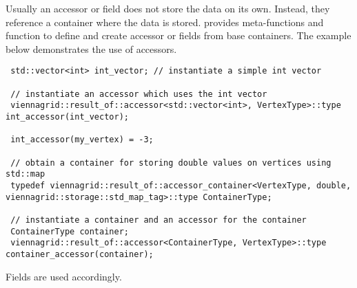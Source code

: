 Usually an accessor or field does not store the data on its own.
Instead, they reference a container where the data is stored.
{\ViennaGrid} provides meta-functions and function to define and create accessor or fields from base containers.
The example below demonstrates the use of {\ViennaGrid} accessors.
 \begin{lstlisting}
 std::vector<int> int_vector; // instantiate a simple int vector

 // instantiate an accessor which uses the int vector
 viennagrid::result_of::accessor<std::vector<int>, VertexType>::type int_accessor(int_vector);

 int_accessor(my_vertex) = -3;

 // obtain a container for storing double values on vertices using std::map
 typedef viennagrid::result_of::accessor_container<VertexType, double, viennagrid::storage::std_map_tag>::type ContainerType;

 // instantiate a container and an accessor for the container
 ContainerType container;
 viennagrid::result_of::accessor<ContainerType, VertexType>::type container_accessor(container);
\end{lstlisting}
Fields are used accordingly.
